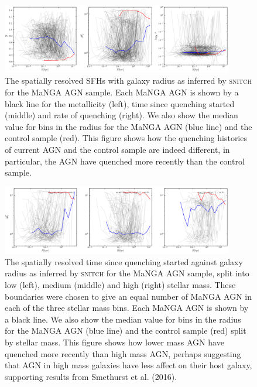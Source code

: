 \documentclass[useAMS,usenatbib]{mn2e}
\begin{document}
\begin{figure}\label{spaghettiall}
\includegraphics[width=0.9\textwidth]{../data/ellison/figures/manga_agn_spaghetti.png}
\caption{The spatially resolved SFHs with galaxy radius as inferred by \textsc{snitch} for the MaNGA AGN sample. Each MaNGA AGN is shown by a black line for the metallicity (left), time since quenching started (middle) and rate of quenching (right). We also show the median value for bins in the radius for the MaNGA AGN (blue line) and the control sample (red). This figure shows how the quenching histories of current AGN and the control sample are indeed different, in particular, the AGN have quenched more recently than the control sample.}
\end{figure}

\begin{figure}
\includegraphics[width=0.9\textwidth]{../data/ellison/figures/median_deltatq_with_kpc_radius_ellison_splitmass.png}
\caption{The spatially resolved time since quenching started against galaxy radius as inferred by \textsc{snitch} for the MaNGA AGN sample, split into low (left), medium (middle) and high (right) stellar mass. These boundaries were chosen to give an equal number of MaNGA AGN in each of the three stellar mass bins. Each MaNGA AGN is shown by a black line. We also show the median value for bins in the radius for the MaNGA AGN (blue line) and the control sample (red) split by stellar mass. This figure shows how lower mass AGN have quenched more recently than high mass AGN, perhaps suggesting that AGN in high mass galaxies have less affect on their host galaxy, supporting results from Smethurst et al. (2016).}
\label{fig:spaghettimass}
\end{figure}
\end{document}
